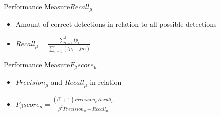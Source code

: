 \begin{frame}{Performance Measure}{$Recall_{\mu}$}
    \begin{center}
        \begin{itemize}
            \item Amount of correct detections in relation to all possible detections

            \item $Recall_{\mu} = \frac{\sum \limits_{i=1}^{l} tp_i}{\sum \limits_{i=1}^{l} (tp_i + fn_i)}$
        \end{itemize}
    \end{center}
\end{frame}

\begin{frame}{Performance Measure}{$F_{\beta}score_{\mu}$}
    \begin{center}
        \begin{itemize}
            \item $Precision_{\mu}$ and $Recall_{\mu}$ in relation

            \item $F_{\beta}score_{\mu} = \frac{(\beta^2 + 1)Precision_{\mu} Recall_{\mu}}{\beta^2 Precision_{\mu} + Recall_{\mu}}$
        \end{itemize}
    \end{center}
\end{frame}
